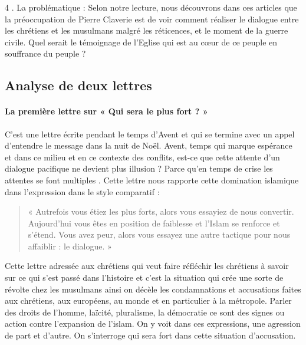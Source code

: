 4 . La problématique : Selon notre lecture, nous découvrons dans ces articles que la préoccupation de Pierre Claverie est de voir comment réaliser le dialogue entre les chrétiens et les musulmans malgré les réticences, et le moment de la guerre civile. Quel serait le témoignage de l’Eglise qui est au cœur de ce peuple en souffrance du peuple ?

\subsection{Analyse de deux lettres }
 
 \paragraph{La première lettre sur « Qui sera le plus fort ? » }
 
 C’est une lettre écrite pendant le temps d’Avent et qui se termine avec un appel d’entendre le message dans la nuit de Noël. 
Avent, temps qui marque espérance et dans ce milieu et en ce contexte des conflits, est-ce que cette attente d’un dialogue pacifique ne devient plus illusion ? Parce qu’en temps de crise les attentes se font multiples . Cette lettre nous rapporte cette domination islamique dans l’expression dans le style comparatif :\begin{quote}
    « Autrefois vous étiez les plus forts, alors vous essayiez de nous convertir. Aujourd’hui vous êtes en position de faiblesse et l’Islam se renforce et s’étend. Vous avez peur, alors vous essayez une autre tactique pour nous affaiblir : le dialogue. »
\end{quote} 

Cette lettre adressée aux chrétiens qui veut faire réfléchir les chrétiens à savoir sur ce qui s’est passé dans l’histoire et c’est la situation qui crée une sorte de révolte chez les musulmans ainsi on décèle les condamnations et accusations faites aux chrétiens, aux européens, au monde et en particulier à la métropole. Parler des droits de l’homme, laïcité, pluralisme, la démocratie ce sont des signes ou action contre l’expansion de l’islam. On y voit dans ces expressions, une agression de part et d’autre. On s’interroge qui sera fort dans cette situation d’accusation. 

